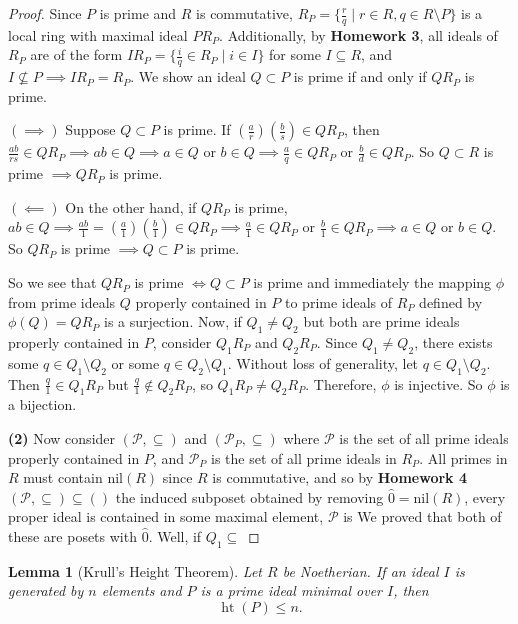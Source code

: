\documentclass[addpoints,10pt]{exam}
\theoremstyle{plain}
\theoremstyle{definition}
\theoremstyle{plain}
\theoremstyle{plain}
\newtheorem{lem}[thm]{Lemma}
\theoremstyle{definition}
\newcommand{\PP}{\ensuremath{\mathcal{P}}}
\newcommand{\nil}{\ensuremath{\mathrm{nil}}}
\begin{document}
\begin{proof}
    Since $P$ is prime and $R$ is commutative, $R_{P}=\{\frac{r}{q}\mid r\in R, q\in R\setminus P\}$ is a local ring with maximal ideal $PR_{P}$. Additionally, by \textbf{Homework 3}, all ideals of $R_{P}$ are of the form $IR_{P}=\{\frac{i}{q}\in R_{P}\mid i\in I\}$ for some $I\subseteq R$, and $I\not\subseteq P\implies IR_{P}=R_{P}$. We show an ideal $Q\subset P$ is prime if and only if $QR_{P}$ is prime.
    
    $(\implies)$ Suppose $Q\subset P$ is prime. If $(\frac{a}{r})(\frac{b}{s})\in QR_{P}$, then $\frac{ab}{rs}\in QR_{P}\implies ab\in Q\implies a\in Q\text{ or }b\in Q\implies \frac{a}{q}\in QR_{P}\text{ or }\frac{b}{d}\in QR_{P}$. So $Q\subset R$ is prime $\implies QR_{P}$ is prime. 
    
    $(\impliedby)$ On the other hand, if $QR_{P}$ is prime, $ab\in Q\implies \frac{ab}{1}=(\frac{a}{1})(\frac{b}{1})\in QR_{P}\implies \frac{a}{1}\in QR_{P}\text{ or }\frac{b}{1}\in QR_{P}\implies a\in Q\text{ or }b\in Q.$ So $QR_{P}$ is prime $\implies Q\subset P$ is prime.

    So we see that $QR_{P}$ is prime $\iff Q\subset P$ is prime and immediately the mapping $\phi$ from prime ideals $Q$ properly contained in $P$ to prime ideals of $R_{P}$ defined by $\phi(Q)=QR_{P}$ is a surjection. Now, if $Q_{1}\neq Q_{2}$ but both are prime ideals properly contained in $P$, consider $Q_{1}R_{P}$ and $Q_{2}R_{P}$. Since $Q_{1}\neq Q_{2}$, there exists some $q\in Q_{1}\setminus Q_{2}$ or some $q\in Q_{2}\setminus Q_{1}$. Without loss of generality, let $q\in Q_{1}\setminus Q_{2}$. Then $\frac{q}{1}\in Q_{1}R_{P}$ but $\frac{q}{1}\not\in Q_{2}R_{P}$, so $Q_{1}R_{P}\neq Q_{2}R_{P}$. Therefore, $\phi$ is injective. So $\phi$ is a bijection.

    \textbf{(2)} Now consider $(\PP,\subseteq)$ and $(\PP_{P},\subseteq)$ where $\PP$ is the set of all prime ideals properly contained in $P$, and $\PP_{P}$ is the set of all prime ideals in $R_{P}$. All primes in $R$ must contain $\mathrm{nil}(R)$ since $R$ is commutative, and so by \textbf{Homework 4} $(\PP,\subseteq)\subseteq ()$ the induced subposet obtained by removing $\hat{0}=\nil(R)$, every proper ideal is contained in some maximal element,  $\PP$ is  We proved that both of these are posets with $\hat{0}$. Well, if $Q_{1}\subseteq $
\end{proof}
\newpage
\begin{lem}[Krull's Height Theorem]
Let $R$ be Noetherian. If an ideal $I$ is generated by $n$ elements and $P$ is a prime ideal minimal over $I$, then
\[
\operatorname{ht}(P)\leq n.
\]
\end{lem}
\end{document}
